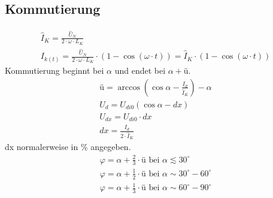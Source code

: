\subsection{Kommutierung}
\begin{gather*}
\hat{I}_K = \frac{\hat{U}_N}{2 \cdot \omega \cdot L_K} \\
I_{k(t)} = \frac{\hat{U}_N}{2 \cdot \omega \cdot L_K} \cdot (1 - \cos(\omega \cdot t)) = \hat{I}_K \cdot (1 - \cos(\omega \cdot t))
\end{gather*}
Kommutierung beginnt bei $\alpha$ und endet bei $\alpha + \text{ü}$.
\begin{gather*}
\text{ü} = \arccos\left(\cos\alpha - \frac{I_d}{\hat{I}_K}\right) - \alpha \\
U_d = U_{di0}(\cos\alpha - dx) \\
U_{dx} = U_{di0} \cdot dx \\
dx = \frac{I_d}{2 \cdot \hat{I}_K}
\end{gather*}
dx normalerweise in \% angegeben.
\begin{gather*}
\varphi = \alpha + \frac{2}{3} \cdot \text{ü} \text{ bei } \alpha \lesssim 30^\circ \\
\varphi = \alpha + \frac{1}{2} \cdot \text{ü} \text{ bei } \alpha \sim 30^\circ - 60^\circ \\
\varphi = \alpha + \frac{1}{3} \cdot \text{ü} \text{ bei } \alpha \sim 60^\circ - 90^\circ
\end{gather*}

\columnbreak
